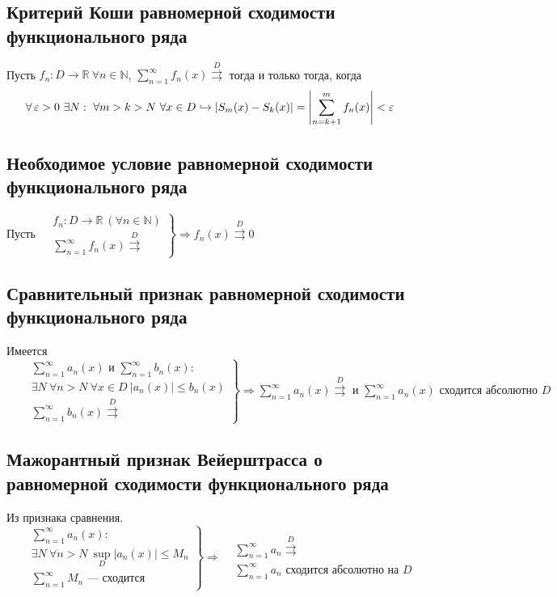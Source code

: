 \documentclass[a4paper]{article}
\begin{document}
\subsection{Критерий Коши равномерной сходимости функционального ряда}
\theorem Пусть $f_n:D\to\mathbb{R}\ \forall n\in\mathbb{N}$, $\sum_{n=1}^{\infty}f_n(x)\overset{D}{\rightrightarrows}$ тогда и только тогда, когда
\begin{equation*}
    \forall \ve>0\ \exists N:\ \forall m>k>N\ \forall x\in D\hookrightarrow |S_m(x)-S_k(x)|=\left|\sum_{n=k+1}^{m}f_n(x)\right|<\ve
\end{equation*}

\subsection{Необходимое условие равномерной сходимости функционального ряда}
\corollary Пусть $\left.\begin{aligned}
   &f_n:D\to\mathbb{R}\ (\forall n\in\mathbb{N})\\
   &\sum_{n=1}^{\infty}f_n(x)\overset{D}{\rightrightarrows}
\end{aligned}\right\}\Longrightarrow f_n(x)\overset{D}{\rightrightarrows}0$

\subsection{Сравнительный признак равномерной сходимости функционального ряда}
\theorem Имеется $\quad \left.\begin{aligned}
    &\sum_{n=1}^{\infty}a_n(x)\text{ и }\sum_{n=1}^{\infty}b_n(x):\\
    &\exists N\ \forall n>N\ \forall x\in D\ |a_n(x)|\leqslant b_n(x)\\
    &\sum_{n=1}^{\infty}b_n(x)\overset{D}{\rightrightarrows}
\end{aligned}\right\}\Longrightarrow \sum_{n=1}^{\infty}a_n(x)\overset{D}{\rightrightarrows}\text{ и }\sum_{n=1}^{\infty}a_n(x)\text{ сходится абсолютно }D$

\subsection{Мажорантный признак Вейерштрасса о равномерной сходимости функционального ряда}
\corollary Из признака сравнения. $\quad \left.\begin{aligned}
    &\sum_{n=1}^{\infty}a_n(x):\\
    &\exists N\ \forall n>N\ \sup\limits_{D}|a_n(x)|\leqslant M_n\\
    &\sum_{n=1}^{\infty} M_n\text{ — сходится}
\end{aligned}\right\}\Longrightarrow \begin{aligned}
    &\sum_{n=1}^{\infty}a_n\overset{D}{\rightrightarrows}\\
    &\sum_{n=1}^{\infty}a_n\text{ сходится абсолютно на }D
\end{aligned}$
\end{document}
